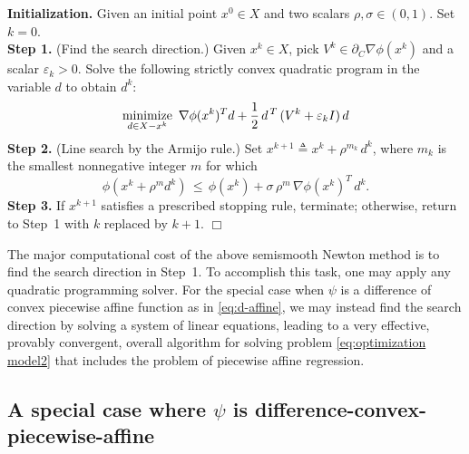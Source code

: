 \documentclass{siamart}
\begin{document}
\noindent
{\bf Initialization.} Given an initial point $x^0 \in X$ and two scalars $\rho, \sigma \in (0,1)$. Set $k=0$.\\[0.1in]
{\bf Step 1.} (Find the search direction.) Given $x^k \in X$, %
pick $V^k\in \partial_C \nabla \phi(x^k)$
and a scalar $\varepsilon_k > 0$.  Solve the following strictly convex quadratic program  in the variable $d$ to obtain $d^k$:
{\small \[
\displaystyle\operatornamewithlimits{\mbox{minimize}}_{d \in X - x^k} \
\nabla \phi(x^k)^T d +
\displaystyle\frac{1}{2}\,d^{\,T}\,(V^k + \varepsilon_k I)\,d
\]}
{\bf Step 2.} (Line search by the Armijo rule.)
Set $x^{k+1} \triangleq x^k + \rho^{m_k} \, d^k$, where $m_k$ is the smallest nonnegative integer $m$ for which
{\small $$
\phi(x^k + \rho^m d^k) \, \leq \, \phi(x^k) +
\sigma \, \rho^m \, \nabla \phi(x^k)^T \, d^k.
$$}
{\bf Step 3.} If $x^{k+1}$ satisfies a prescribed stopping rule, terminate; otherwise,
return to Step~1 with $k$ replaced by $k+1$.  \hfill $\Box$

\noindent\makebox[\linewidth]{\rule{\textwidth}{1pt}}



The major computational cost of the above semismooth Newton method is to find the search direction in Step~1.
To accomplish this task, one may apply any quadratic programming solver.
For the special case when $\psi$ is a difference of convex piecewise affine function as in \eqref{eq:d-affine},
we may instead find the search direction by solving a system of linear equations, leading to a very effective,
provably convergent, overall algorithm for solving problem \eqref{eq:optimization model2} that includes the
problem of piecewise affine regression.

\subsection{A special case where $\psi$ is difference-convex-piecewise-affine}
\end{document}
